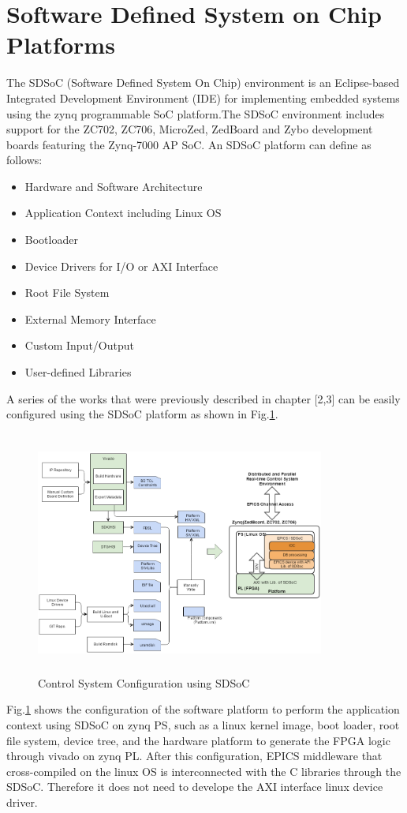\documentclass[journal]{IEEEtran}
\begin{document}
\section{Software Defined System on Chip Platforms}
The SDSoC (Software Defined System On Chip)\cite{sdsoc} environment is an Eclipse-based Integrated Development Environment (IDE) for implementing embedded systems using the zynq programmable SoC platform.The SDSoC environment includes support for the ZC702, ZC706, MicroZed, ZedBoard and Zybo development boards featuring the Zynq-7000 AP SoC.
\hfil\break\hfil\break
An SDSoC platform can define as follows:
\begin{itemize}
 	\item Hardware and Software Architecture
 	\item Application Context including Linux OS
 	\item Bootloader
 	\item Device Drivers for I/O or AXI Interface
 	\item Root File System
	\item External Memory Interface
	\item Custom Input/Output
	\item User-defined Libraries
\end{itemize}
A series of the works that were previously described in chapter [2,3] can be easily configured using the SDSoC platform as shown in Fig.\ref{sdsoc_control_system}. 
\begin{figure}[!htb]
	\centering
	\includegraphics*[width=95mm, height=80mm]{img03.png}
	\caption{Control System Configuration using SDSoC}
	\label{sdsoc_control_system}
\end{figure}
Fig.\ref{sdsoc_control_system} shows the configuration of the software platform to perform the application context using SDSoC on zynq PS, such as a linux kernel image, boot loader, root file system, device tree, and  the hardware platform to generate the FPGA logic through vivado on zynq PL. After this configuration, EPICS middleware that cross-compiled on the linux OS is interconnected with the C libraries through the SDSoC. Therefore it does not need to develope the AXI interface linux device driver.
\end{document}
